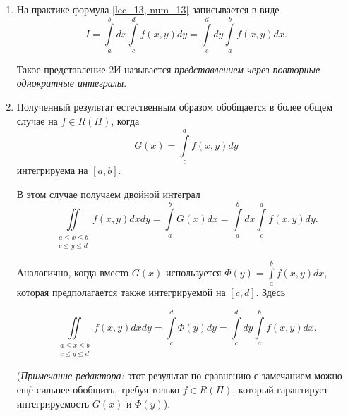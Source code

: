 \documentclass[../../main.tex]{subfiles}
\begin{document}
\begin{rems} 
	
	\quad
	
	\begin{enumerate}
		\item  На практике формула 
		\eqref {lec_13, num_13} записывается в виде 
		\[ I = \int\limits_a^b dx \int\limits_c^d f \left( x, y \right) dy = 
		\int\limits_c^d dy \int\limits_a^b f \left( x, y \right) dx. \]
		
		Такое представление 2И называется 
		\emph{представлением через 
		повторные однократные интегралы}.
		
		\item Полученный результат естественным образом обобщается в более
		общем случае на $ f \in R(\Pi)$, когда
		\[
		G \left( x \right) = \int\limits_c^d f \left( x, y \right) dy
		\]
		интегрируема на $ \left[ a, b \right] $.
		
		В этом случае получаем двойной интеграл
		\begin{equation}
		\label{lec_13, num_17}
		\underset{\substack{
				a \leq x \leq b \\
				c \leq y \leq d
		}}{\iint} f \left( x, y \right) dx dy = 
		\int\limits_a^b G \left( x \right) dx  =
		\int\limits_a^b dx \int\limits_c^d f \left( x, y \right) dy.
		\end{equation}
		
		Аналогично, когда вместо $ G \left( x \right) $ используется
		$\Phi\left( y \right) = \int\limits_a^b f \left( x, y \right) dx $, 
		которая предполагается также интегрируемой на 
		$ \left[ c, d \right]  $. Здесь
		
		\begin{equation}
		\label{lec_13, num_18}
		\underset{\substack{
				a \leq x \leq b \\
				c \leq y \leq d
		}}{\iint} f \left( x, y \right) dx dy = 
		\int\limits_c^d \Phi \left( y \right) dy  =
		\int\limits_c^d dy \int\limits_a^b f \left( x, y \right) dx.
		\end{equation}
		
		(\emph{Примечание редактора:} этот результат по сравнению с замечанием можно ещё сильнее обобщить, требуя только $f\in R(\Pi)$, который гарантирует интегрируемость $G(x)$ и $\Phi(y)$).
	\end{enumerate}
	
\end{rems}
\end{document}
